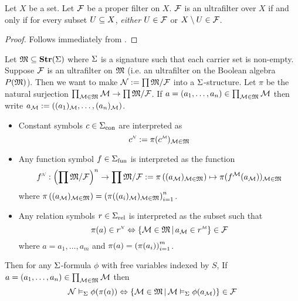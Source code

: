 \begin{prop}
    Let $X$ be a set. 
    Let $\mathcal{F}$ be a proper filter on $X$.
    $\mathcal{F}$ is an ultrafilter over $X$ if and only if for every subset 
    $U \subseteq X$, 
    \emph{either} $U \in \mathcal{F}$ or $X \setminus U \in \mathcal{F}$.
\end{prop}
\begin{proof}
    Follows immediately from .
\end{proof}

\begin{prop}
    Let $\mathfrak{M} \subseteq \mathbf{Str}(\Sigma)$ where $\Sigma$ is a signature
    such that each carrier set is non-empty.
    Suppose $\mathcal{F}$ is an ultrafilter on $\mathfrak{M}$ 
    (i.e. an ultrafilter on the Boolean algebra $P(\mathfrak{M})$).
    Then we want to make $\mathcal{N} := \prod \mathfrak{M} / \mathcal{F}$ into a $\Sigma$-structure.
    Let $\pi$ be the natural surjection 
    $\prod_{\mathcal{M} \in \mathfrak{M}} \mathcal{M} \to \prod \mathfrak{M} / \mathcal{F}$.
    If $a = (a_1, \dots, a_n) \in \prod_{\mathcal{M} \in \mathfrak{M}} \mathcal{M}$ then
    write $a_{\mathcal{M}} := ((a_1)_{\mathcal{M}}, \dots, (a_n)_{\mathcal{M}})$.
    \begin{itemize}
        \item Constant symbols $c \in {\Sigma}_\mathrm{con}$ are interpreted as 
            \[\modintp{\NN}{c} := \pi(\modintp{\MM}{c})_{\MM \in \f{M}}\]
        \item Any function symbol $f \in {\Sigma}_\mathrm{fun}$ is interpreted as the 
            function
            \[\modintp{\NN}{f} : 
            \brkt{\prod \f{M} / \FF}^n \to \prod \f{M} / \FF
            := \pi\brkt{(a_\MM)_{\MM \in \f{M}}} \mapsto 
            \pi(f^\MM (a_\MM))_{\MM \in \f{M}}\]
            where $\pi\left((a_{\mathcal{M}})_{\mathcal{M} \in \mathfrak{M}}\right) = 
            \left(\pi((a_i)_{\mathcal{M}})_{\mathcal{M} \in \mathfrak{M}}\right)_{i=1}^n$.
        \item Any relation symbols 
            $r \in {\Sigma}_\mathrm{rel}$ is interpreted as the subset such that 
            \[\pi(a) \in \modintp{\NN}{r}
            \iff \set{\MM \in \f{M} \st 
            a_\MM \in \modintp{\MM}{r}} \in \FF\]
            where $a = a_1,\dots, a_m$ and $\pi(a) = \left(\pi(a_i)\right)_{i=1}^m$.
    \end{itemize}
    Then for any $\Sigma$-formula $\phi$ with free variables indexed by $S$,
    If $a = (a_1, \dots, a_n) \in \prod_{\mathcal{M} \in \mathfrak{M}} \mathcal{M}$ then 
    \[\mathcal{N} \vDash_{\Sigma} \phi(\pi(a)) \Leftrightarrow 
    \left\{\mathcal{M} \in \mathfrak{M} \,|\, \mathcal{M} \vDash_{\Sigma} \phi(a_{\mathcal{M}})\right\} \in \mathcal{F}\]
\end{prop}
